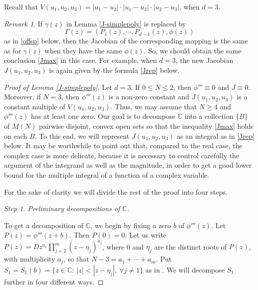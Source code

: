 \documentclass[11 pt]{amsart}
\theoremstyle{plain}
\numberwithin{equation}{section}
\theoremstyle{plain}
\numberwithin{equation}{section}
\theoremstyle{remark}
\newtheorem{remark}[theorem]{Remark}
\begin{document}
Recall that $V(u_1, u_2, u_3) = |u_1 - u_2| \cdot |u_1 - u_3| \cdot |u_2 - u_3|$, when $d=3$.

\begin{remark}\label{rem-Gamma}
If $\gamma(z)$ in Lemma \ref{J-simplepoly} is replaced by
\[ \Gamma(z) = (P_1(z), \cdots, P_{d-1}(z), \phi(z))
\]
as in \eqref{offsp} below, then the Jacobian of the corresponding mapping is the same as for $\gamma(z)$ when they have the same $\phi(z)$. So, we should obtain the same conclusion \eqref{Jmax} in this case. For example, when $d=3$, the new Jacobian $J(u_1, u_2, u_3)$ is again given by the formula \eqref{Jrep} below.
\end{remark}

\begin{proof}[Proof of Lemma \ref{J-simplepoly}] Let $d=3$. If $0\le N\le 2$, then $\phi'''\equiv 0$ and $J\equiv 0$. Moreover, if $N=3$, then $\phi'''(z)$ is a non-zero constant and $J(u_1, u_2, u_3)$ is a constant multiple of $V(u_1, u_2, u_3)$. Thus, we may assume that $N\ge 4$ and $\phi'''(z)$ has at least one zero.
Our goal is to decompose ${{\mathbb {C}}}$ into a collection $\{ B\}$ of $M(N)$ pairwise disjoint, convex open sets so that the inequality \eqref{Jmax} holds on each $B$. To this end, we will represent $J(u_1, u_2, u_3)$ as an integral as in \eqref{Jrep} below.
It may be worthwhile to point out that, compared to the real case, the complex case is more delicate, because it is necessary to control carefully the argument of the integrand as well as the magnitude, in order to get a good lower bound for the multiple integral of a function of a complex variable.
\medskip

For the sake of clarity we will divide the rest of the proof into four steps.

\medskip

\noindent
{\sl Step 1. Preliminary decompositions of ${{\mathbb {C}}}$.}

To get a decomposition of ${{\mathbb {C}}}$, we begin by fixing a zero $b$ of $\phi'''(z)$. Let $P(z) = \phi'''(z+b)$. Then $P(0)=0$. Let us write $P(z)= D z^{a_1} \prod_{j=2}^m (z-\eta_j)^{a_j}$, where 0 and $\eta_j$ are the distinct roots of $P(z)$, with multiplicity $a_j$, so that $N - 3 = a_1+\cdots+ a_m$. Put $S_1 = S_1(b)= \{ z\in {{\mathbb {C}}}: ~ |z| < |z-\eta_j|, ~ \forall j \not= 1\}$ as in \cite{DeW}. We will decompose $S_1$ further in four different ways.

\medskip


\end{proof}
\end{document}
